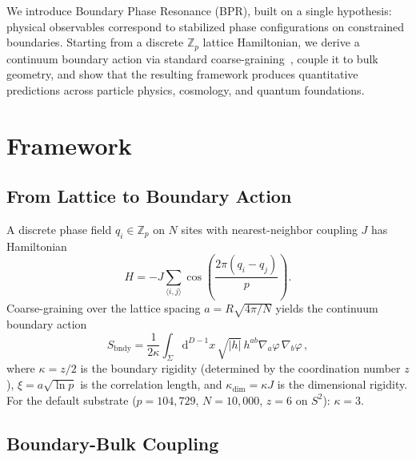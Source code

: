 \documentclass[prd,twocolumn,amsmath,amssymb]{revtex4-2}
\begin{document}
We introduce Boundary Phase Resonance (BPR), built on a single hypothesis: physical observables correspond to stabilized phase configurations on constrained boundaries. Starting from a discrete $\mathbb{Z}_p$ lattice Hamiltonian, we derive a continuum boundary action via standard coarse-graining~\cite{Kadanoff1966,Wilson1971}, couple it to bulk geometry, and show that the resulting framework produces quantitative predictions across particle physics, cosmology, and quantum foundations.

\section{Framework}
\label{sec:framework}

\subsection{From Lattice to Boundary Action}
\label{sec:lattice}

A discrete phase field $q_i \in \mathbb{Z}_p$ on $N$ sites with nearest-neighbor coupling $J$ has Hamiltonian
\begin{equation}\label{eq:H}
H = -J \sum_{\langle i,j\rangle} \cos\!\left(\frac{2\pi(q_i - q_j)}{p}\right).
\end{equation}
Coarse-graining over the lattice spacing $a = R\sqrt{4\pi/N}$ yields the continuum boundary action
\begin{equation}\label{eq:S}
S_{\mathrm{bndy}} = \frac{1}{2\kappa}\int_\Sigma \mathrm{d}^{D-1}x\,\sqrt{|h|}\, h^{ab}\nabla_a\varphi\,\nabla_b\varphi\,,
\end{equation}
where $\kappa = z/2$ is the boundary rigidity (determined by the coordination number $z$), $\xi = a\sqrt{\ln p}$ is the correlation length, and $\kappa_{\mathrm{dim}} = \kappa J$ is the dimensional rigidity. For the default substrate ($p = 104{,}729$, $N = 10{,}000$, $z = 6$ on $S^2$): $\kappa = 3$.

\subsection{Boundary-Bulk Coupling}
\label{sec:coupling}
\end{document}
